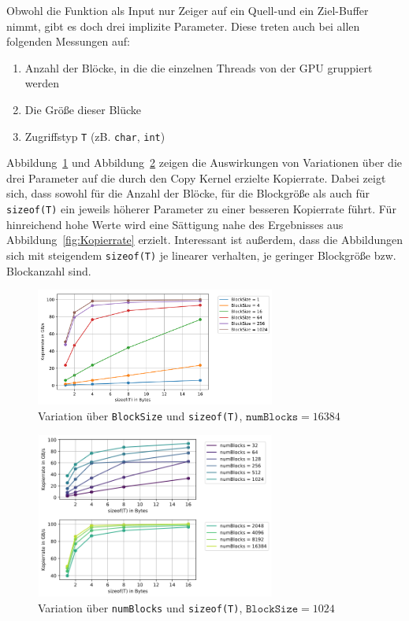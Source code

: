 \documentclass[11pt, abstract=on]{scrartcl}
\begin{document}
Obwohl die Funktion als Input nur Zeiger auf ein Quell-und ein Ziel-Buffer nimmt, gibt es doch drei implizite Parameter. Diese treten auch bei allen folgenden Messungen auf:
\begin{enumerate}
	\item Anzahl der Blöcke, in die die einzelnen Threads von der GPU gruppiert werden
	\item Die Größe dieser Blücke
	\item Zugriffstyp \texttt{T} (zB. \texttt{char}, \texttt{int})
\end{enumerate}
 Abbildung~\ref{fig:CopyKernel1} und Abbildung~\ref{fig:CopyKernelBlocks} zeigen die Auswirkungen von Variationen über die drei Parameter auf die durch den Copy Kernel erzielte Kopierrate. Dabei zeigt sich, dass sowohl für die Anzahl der Blöcke, für die Blockgröße als auch für \texttt{sizeof(T)} ein jeweils höherer Parameter zu einer besseren Kopierrate führt. Für hinreichend hohe Werte wird eine Sättigung nahe des Ergebnisses aus Abbildung~\ref{fig:Kopierrate} erzielt. Interessant ist außerdem, dass die Abbildungen sich mit steigendem \texttt{sizeof(T)} je linearer verhalten, je geringer Blockgröße bzw. Blockanzahl sind.

\begin{figure} [htbp]
 	\centering
 		\includegraphics[width=0.7\textwidth]{Graph_CopyKernel1.png}
 	\caption{Variation über \texttt{BlockSize} und \texttt{sizeof(T)}, $\texttt{numBlocks} = 16384$}
 	\label{fig:CopyKernel1}
\end{figure}

\begin{figure} [htbp]
 	\centering
 		\includegraphics[width=0.7\textwidth]{Graph_CopyKernelBlocks.png}
 	\caption{Variation über \texttt{numBlocks} und \texttt{sizeof(T)}, $\texttt{BlockSize} = 1024$}
 	\label{fig:CopyKernelBlocks}
\end{figure}
\end{document}
